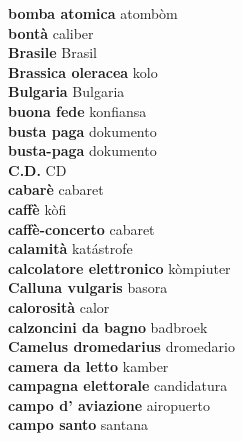 \textbf{ bomba atomica  } atombòm \\
\textbf{ bontà  } caliber \\
\textbf{ Brasile  } Brasil \\
\textbf{ Brassica oleracea  } kolo \\
\textbf{ Bulgaria  } Bulgaria \\
\textbf{ buona fede  } konfiansa \\
\textbf{ busta paga  } dokumento \\
\textbf{ busta-paga  } dokumento \\
\textbf{ C.D.  } CD \\
\textbf{ cabarè  } cabaret \\
\textbf{ caffè  } kòfi \\
\textbf{ caffè-concerto  } cabaret \\
\textbf{ calamità  } katástrofe \\
\textbf{ calcolatore elettronico  } kòmpiuter \\
\textbf{ Calluna vulgaris  } basora \\
\textbf{ calorosità  } calor \\
\textbf{ calzoncini da bagno  } badbroek \\
\textbf{ Camelus dromedarius  } dromedario \\
\textbf{ camera da letto  } kamber \\
\textbf{ campagna elettorale  } candidatura \\
\textbf{ campo d’ aviazione  } airopuerto \\
\textbf{ campo santo  } santana \\
